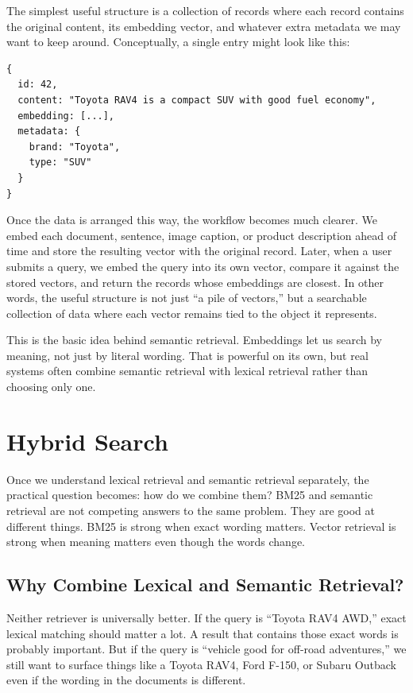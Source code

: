 \documentclass[12pt]{article}
\begin{document}
The simplest useful structure is a collection of records where each
record contains the original content, its embedding vector, and whatever
extra metadata we may want to keep around. Conceptually, a single entry
might look like this:

\begin{verbatim}
{
  id: 42,
  content: "Toyota RAV4 is a compact SUV with good fuel economy",
  embedding: [...],
  metadata: {
    brand: "Toyota",
    type: "SUV"
  }
}
\end{verbatim}

Once the data is arranged this way, the workflow becomes much clearer. We
embed each document, sentence, image caption, or product description
ahead of time and store the resulting vector with the original record.
Later, when a user submits a query, we embed the query into its own
vector, compare it against the stored vectors, and return the records
whose embeddings are closest. In other words, the useful structure is not
just ``a pile of vectors,'' but a searchable collection of data where
each vector remains tied to the object it represents.

This is the basic idea behind semantic retrieval. Embeddings let us search
by meaning, not just by literal wording. That is powerful on its own, but
real systems often combine semantic retrieval with lexical retrieval
rather than choosing only one.

\section{Hybrid Search}

Once we understand lexical retrieval and semantic retrieval separately,
the practical question becomes: how do we combine them? BM25 and semantic
retrieval are not competing answers to the same problem. They are good at
different things. BM25 is strong when exact wording matters. Vector
retrieval is strong when meaning matters even though the words change.

\subsection{Why Combine Lexical and Semantic Retrieval?}

Neither retriever is universally better. If the query is ``Toyota RAV4
AWD,'' exact lexical matching should matter a lot. A result that contains
those exact words is probably important. But if the query is ``vehicle
good for off-road adventures,'' we still want to surface things like a
Toyota RAV4, Ford F-150, or Subaru Outback even if the wording in the
documents is different.
\end{document}
